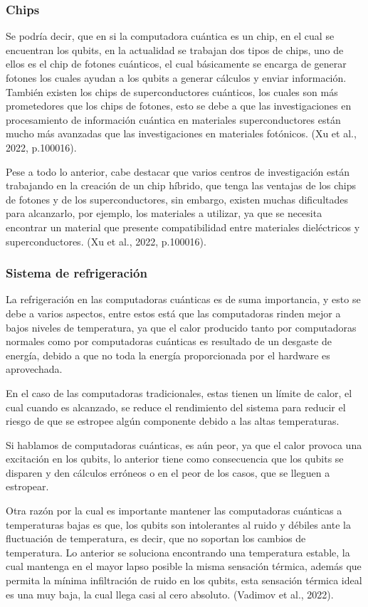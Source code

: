 \documentclass{article}
\begin{document}
\subsubsection{Chips}
Se podría decir, que en si la computadora cuántica es un chip, en el cual se encuentran los qubits, en la actualidad se trabajan dos tipos de chips, uno de ellos es el chip de fotones cuánticos, el cual básicamente se encarga de generar fotones los cuales ayudan a los qubits a generar cálculos y enviar información. También existen los chips de superconductores cuánticos, los cuales son más prometedores que los chips de fotones, esto se debe a que las investigaciones en procesamiento de información cuántica en materiales superconductores están mucho más avanzadas que las investigaciones en materiales fotónicos. (Xu et al., 2022, p.100016).

Pese a todo lo anterior, cabe destacar que varios centros de investigación están trabajando en la creación de un chip híbrido, que tenga las ventajas de los chips de fotones y de los superconductores, sin embargo, existen muchas dificultades para alcanzarlo, por ejemplo, los materiales a utilizar, ya que se necesita encontrar un material que presente compatibilidad entre materiales dieléctricos y superconductores. (Xu et al., 2022, p.100016).

\subsubsection{Sistema de refrigeración}
La refrigeración en las computadoras cuánticas es de suma importancia, y esto se debe a varios aspectos, entre estos está que las computadoras rinden mejor a bajos niveles de temperatura, ya que el calor producido tanto por computadoras normales como por computadoras cuánticas es resultado de un desgaste de energía, debido a que no toda la energía proporcionada por el hardware es aprovechada.
 
En el caso de las computadoras tradicionales, estas tienen un límite de calor, el cual cuando es alcanzado, se reduce el rendimiento del sistema para reducir el riesgo de que se estropee algún componente debido a las altas temperaturas.

 Si hablamos de computadoras cuánticas, es aún peor, ya que el calor provoca una excitación en los qubits, lo anterior tiene como consecuencia que los qubits se disparen y den cálculos erróneos o en el peor de los casos, que se lleguen a estropear. 

Otra razón por la cual es importante mantener las computadoras cuánticas a temperaturas bajas es que, los qubits son intolerantes al ruido y débiles ante la fluctuación de temperatura, es decir, que no soportan los cambios de temperatura. Lo anterior se soluciona encontrando una temperatura estable, la cual mantenga en el mayor lapso posible la misma sensación térmica, además que permita la mínima infiltración de ruido en los qubits, esta sensación térmica ideal es una muy baja, la cual llega casi al cero absoluto. (Vadimov et al., 2022).
\end{document}
